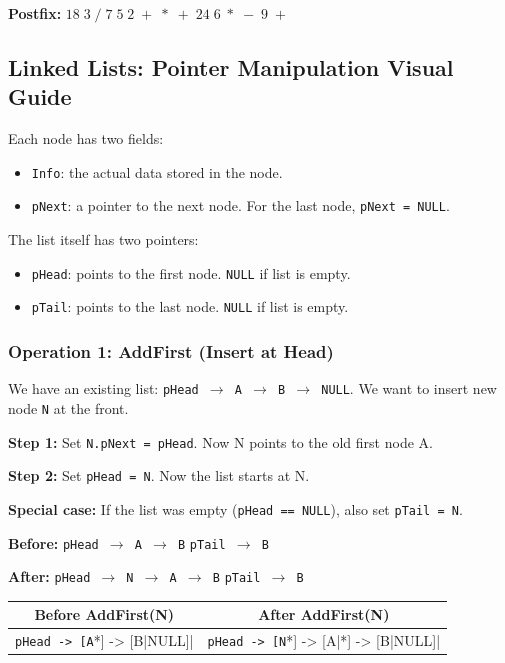 \documentclass[12pt,portrait]{article}
\begin{document}
\textbf{Postfix:} $18\;3\;/ \;7\;5\;2\;+\;*\;+\;24\;6\;*\;-\;9\;+$

\subsection{Linked Lists: Pointer Manipulation Visual Guide}
\label{sec:linkedlist}

\begin{rulebox}
Each node has two fields:
\begin{itemize}[leftmargin=*]
    \item \texttt{Info}: the actual data stored in the node.
    \item \texttt{pNext}: a pointer to the next node. For the last node, \texttt{pNext = NULL}.
\end{itemize}
The list itself has two pointers:
\begin{itemize}[leftmargin=*]
    \item \texttt{pHead}: points to the first node. \texttt{NULL} if list is empty.
    \item \texttt{pTail}: points to the last node. \texttt{NULL} if list is empty.
\end{itemize}
\end{rulebox}

\subsubsection{Operation 1: AddFirst (Insert at Head)}

\begin{rulebox}
We have an existing list: \texttt{pHead $\to$ A $\to$ B $\to$ NULL}. We want to insert new node \texttt{N} at the front.

\textbf{Step 1:} Set \texttt{N.pNext = pHead}. Now N points to the old first node A.

\textbf{Step 2:} Set \texttt{pHead = N}. Now the list starts at N.

\textbf{Special case:} If the list was empty (\texttt{pHead == NULL}), also set \texttt{pTail = N}.

\textbf{Before:} \texttt{pHead $\to$ A $\to$ B} \quad \texttt{pTail $\to$ B}

\textbf{After:} \texttt{pHead $\to$ N $\to$ A $\to$ B} \quad \texttt{pTail $\to$ B}
\end{rulebox}

\begin{center}
\begin{tabular}{c|c}
\toprule
\textbf{Before AddFirst(N)} & \textbf{After AddFirst(N)} \\
\midrule
\verb|pHead -> [A|*] -> [B|NULL]| & \verb|pHead -> [N|*] -> [A|*] -> [B|NULL]| \\
\bottomrule
\end{tabular}
\end{center}
\end{document}
